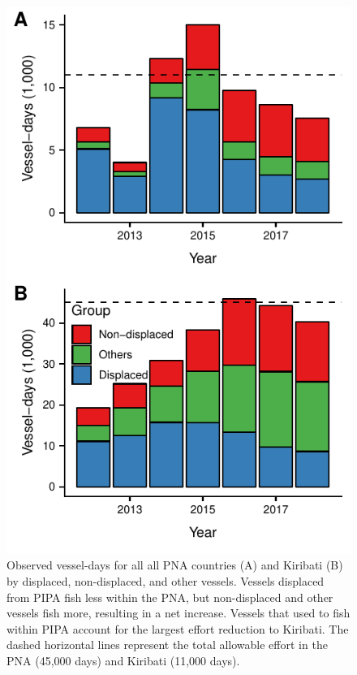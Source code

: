 \documentclass[12pt]{article}
\begin{document}
\begin{figure}[htbp]
\centering
\includegraphics{img/all_PS_VDS_PNA_KIR_year.pdf}
\caption{\label{fig:all_PS_VDS_year}Observed vessel-days for all all PNA countries (A) and Kiribati (B) by displaced, non-displaced, and other vessels. Vessels displaced from PIPA fish less within the PNA, but non-displaced and other vessels fish more, resulting in a net increase. Vessels that used to fish within PIPA account for the largest effort reduction to Kiribati. The dashed horizontal lines represent the total allowable effort in the PNA (45,000 days) and Kiribati (11,000 days).}
\end{figure}
\end{document}
